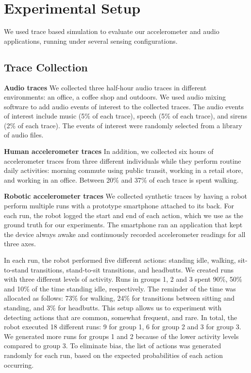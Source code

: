 \section{Experimental Setup}
\label{sec:experimentalSetup}

We used trace based simulation to evaluate our accelerometer and 
audio applications, running under several sensing configurations.

\subsection{Trace Collection}
\label{sec:traces}

{\bf Audio traces} 
We collected three half-hour audio traces in
different environments: an office, a coffee shop and outdoors.  We
used audio mixing software to add audio events of interest to the
collected traces.  The audio events of interest include music (5\%
of each trace), speech (5\% of each trace), and sirens (2\% of each 
trace).  The events of interest were randomly selected from a library
of audio files.

{\bf Human accelerometer traces}
In addition, we collected six hours of accelerometer traces from
three different individuals while they perform routine daily
activities: morning commute using public transit, working in a retail
store, and working in an office.  Between 20\% and 37\% of each trace
is spent walking.

{\bf Robotic accelerometer traces} We collected synthetic traces by having 
a robot perform multiple runs with a prototype smartphone attached 
to its back.  For each run, the robot logged the start and end of each 
action, which we use as the ground truth for our experiments.  The 
smartphone ran an application that kept the device always awake and 
continuously recorded accelerometer readings for all three axes. 

In each run, the robot performed five different actions: standing
idle, walking, sit-to-stand transitions, stand-to-sit transitions, and
headbutts.  We created runs with three different levels of activity.
Runs in groups 1, 2 and 3 spent 90\%, 50\% and 10\% of the time
standing idle, respectively. The reminder of the time was allocated as
follows: 73\% for walking, 24\% for transitions between sitting and
standing, and 3\% for headbutts.  This setup allows us to experiment
with detecting actions that are common, somewhat frequent, and rare.
In total, the robot executed 18 different runs: 9 for group 1, 6
for group 2 and 3 for group 3.  We generated more runs for groups 1
and 2 because of the lower activity levels compared to group 3. To
eliminate bias, the list of actions was generated randomly for each
run, based on the expected probabilities of each action occurring.


